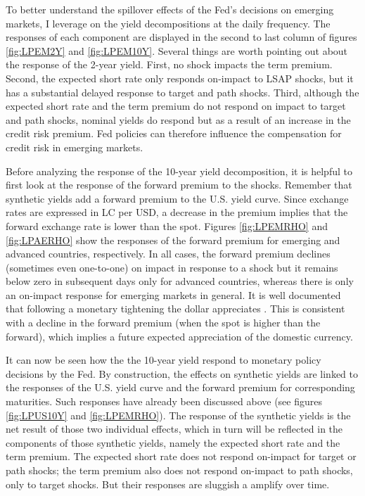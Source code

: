 {To better understand the spillover effects of the Fed's decisions on emerging markets, I leverage on the yield decompositions at the daily frequency.
The responses of each component are displayed in the second to last column of figures \ref{fig:LPEM2Y} and \ref{fig:LPEM10Y}.
Several things are worth pointing out about the response of the 2-year yield. First, no shock impacts the term premium. 
Second, the expected short rate only responds on-impact to LSAP shocks, but it has a substantial delayed response to target and path shocks.
Third, although the expected short rate and the term premium do not respond on impact to target and path shocks, nominal yields do respond but as a result of an increase in the credit risk premium.
Fed policies can therefore influence the compensation for credit risk in emerging markets.

Before analyzing the response of the 10-year yield decomposition, it is helpful to first look at the response of the forward premium to the shocks.
Remember that synthetic yields add a forward premium to the U.S. yield curve.
Since exchange rates are expressed in LC per USD, a decrease in the premium implies that the forward exchange rate is lower than the spot.
Figures \ref{fig:LPEMRHO} and \ref{fig:LPAERHO} show the responses of the forward premium for emerging and advanced countries, respectively.
In all cases, the forward premium declines (sometimes even one-to-one) on impact  in response to a shock but it remains below zero in subsequent days only for advanced countries, whereas there is only an on-impact response for emerging markets in general.
It is well documented that following a monetary tightening the dollar appreciates
\citep{FerrariKearnsSchrimpf:2017}.
This is consistent with a decline in the forward premium (when the spot is higher than the forward), which implies a future expected appreciation of the domestic currency.

It can now be seen how the the 10-year yield respond to monetary policy decisions by the Fed.
By construction, the effects on synthetic yields are linked to the responses of the U.S. yield curve and the forward premium for corresponding maturities.
Such responses have already been discussed above (see figures \ref{fig:LPUS10Y} and \ref{fig:LPEMRHO}).
The response of the synthetic yields is the net result of those two individual effects, which in turn will be reflected in the components of those synthetic yields, namely the expected short rate and the term premium.
The expected short rate does not respond on-impact for target or path shocks; the term premium also does not respond on-impact to path shocks, only to target shocks.
But their responses are sluggish a amplify over time.

}

